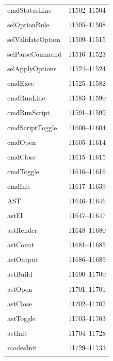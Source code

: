 {\begin{longtable}{@{}p{11cm}r@{}}
cmdStatusLine & 11502--11504 \\\\\hline
selOptionRule & 11505--11508 \\\\\hline
selValidateOption & 11509--11515 \\\\\hline
selParseCommand & 11516--11523 \\\\\hline
selApplyOptions & 11524--11524 \\\\\hline
cmdExec & 11525--11582 \\\\\hline
cmdRunLine & 11583--11590 \\\\\hline
cmdRunScript & 11591--11599 \\\\\hline
cmdScriptToggle & 11600--11604 \\\\\hline
cmdOpen & 11605--11614 \\\\\hline
cmdClose & 11615--11615 \\\\\hline
cmdToggle & 11616--11616 \\\\\hline
cmdInit & 11617--11639 \\\\\hline
AST & 11646--11646 \\\\\hline
astEl & 11647--11647 \\\\\hline
astRender & 11648--11680 \\\\\hline
astCount & 11681--11685 \\\\\hline
astOutput & 11686--11689 \\\\\hline
astBuild & 11690--11700 \\\\\hline
astOpen & 11701--11701 \\\\\hline
astClose & 11702--11702 \\\\\hline
astToggle & 11703--11703 \\\\\hline
astInit & 11704--11728 \\\\\hline
modesInit & 11729--11733 \\\\\hline
\bottomrule\end{longtable}}

